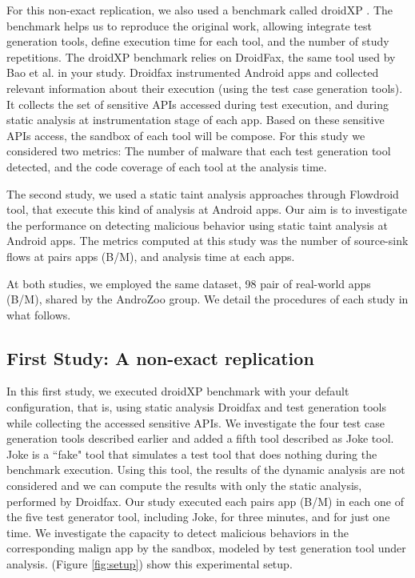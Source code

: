 For this non-exact replication, we also used a benchmark called droidXP \cite{DBLP:conf/scam/CostaMCMVBC20}. The benchmark helps us to reproduce the original work, allowing integrate test generation tools, define execution time for each tool, and the number of study repetitions. The droidXP benchmark relies on DroidFax, the same tool used by Bao et al. in your study. Droidfax instrumented Android apps and collected relevant information about their execution (using the test case generation tools). It collects the set of sensitive APIs accessed during test execution, and during static analysis at instrumentation stage of each app. Based on these sensitive APIs access, the sandbox of each tool will be compose. For this study we considered two metrics: The number of malware that each test generation tool detected, and the code coverage of each tool at the analysis time.  

The second study, we used a static taint analysis approaches through Flowdroid \cite{DBLP:conf/pldi/ArztRFBBKTOM14} tool, that execute this kind of analysis at Android apps. Our aim is to investigate the performance on detecting malicious behavior using static taint analysis at Android apps. The metrics computed at this study was the number of source-sink flows at pairs apps (B/M), and analysis time at each apps.

At both studies, we employed the same dataset, 98 pair of real-world apps (B/M), shared by the AndroZoo \cite{DBLP:conf/msr/AllixBKT16} group. We detail the procedures of each study in what follows.

\subsection{First Study: A non-exact replication}

In this first study, we executed droidXP benchmark with your default configuration, that is, using static analysis Droidfax and test generation tools while collecting the accessed sensitive APIs. We investigate the four test case generation tools described earlier and added a fifth tool described as Joke tool. Joke is a ``fake" tool that simulates a test tool that does nothing during the benchmark execution. Using this tool, the results of the dynamic analysis are not considered and we can compute the results with only the static analysis, performed by Droidfax. Our study executed each pairs app (B/M) in each one of the five test generator tool, including Joke, for three minutes, and for just one time. We investigate the capacity to detect malicious behaviors in the corresponding malign app by the sandbox, modeled by test generation tool under analysis. (Figure \ref{fig:setup}) show this experimental setup.

